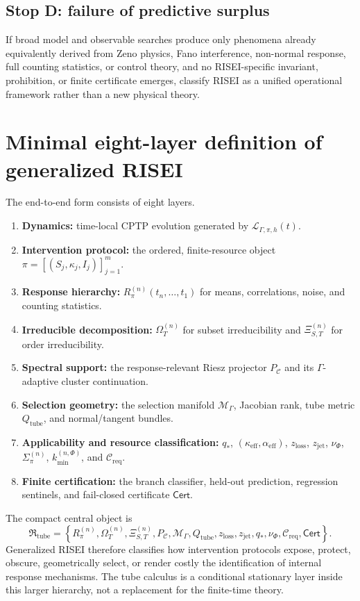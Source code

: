 \documentclass[11pt]{article}
\theoremstyle{definition}
\theoremstyle{remark}
\newcommand{\cL}{\mathcal L}
\newcommand{\cC}{\mathcal C}
\newcommand{\PhiF}{\Phi}
\newcommand{\OmegaI}{\Omega}
\newcommand{\XiI}{\Xi}
\newcommand{\cM}{\mathcal M}
\begin{document}
\subsection{Stop D: failure of predictive surplus}

If broad model and observable searches produce only phenomena already equivalently derived from Zeno physics, Fano interference, non-normal response, full counting statistics, or control theory, and no RISEI-specific invariant, prohibition, or finite certificate emerges, classify RISEI as a unified operational framework rather than a new physical theory.

\section{Minimal eight-layer definition of generalized RISEI}

The end-to-end form consists of eight layers.
\begin{enumerate}
  \item \textbf{Dynamics:} time-local CPTP evolution generated by $\cL_{\Gamma,\pi,h}(t)$.
  \item \textbf{Intervention protocol:} the ordered, finite-resource object $\pi=[(S_j,\kappa_j,I_j)]_{j=1}^{m}$.
  \item \textbf{Response hierarchy:} $R_{\pi}^{(n)}(t_n,\ldots,t_1)$ for means, correlations, noise, and counting statistics.
  \item \textbf{Irreducible decomposition:} $\OmegaI_T^{(n)}$ for subset irreducibility and $\XiI_{S,T}^{(n)}$ for order irreducibility.
  \item \textbf{Spectral support:} the response-relevant Riesz projector $P_{\cC}$ and its $\Gamma$-adaptive cluster continuation.
  \item \textbf{Selection geometry:} the selection manifold $\cM_\Gamma$, Jacobian rank, tube metric $Q_{\mathrm{tube}}$, and normal/tangent bundles.
  \item \textbf{Applicability and resource classification:} $q_*$, $(\kappa_{\mathrm{eff}},\alpha_{\mathrm{eff}})$, $z_{\mathrm{loss}}$, $z_{\mathrm{jet}}$, $\nu_{\PhiF}$, $\Sigma_{\pi}^{(n)}$, $k_{\min}^{(n,\PhiF)}$, and $\cC_{\mathrm{req}}$.
  \item \textbf{Finite certification:} the branch classifier, held-out prediction, regression sentinels, and fail-closed certificate $\mathsf{Cert}$.
\end{enumerate}
The compact central object is
\begin{equation}
\boxed{
\mathfrak R_{\mathrm{tube}}
 = \left\{
 R_{\pi}^{(n)},
 \OmegaI_T^{(n)},
 \XiI_{S,T}^{(n)},
 P_{\cC},
 \cM_\Gamma,
 Q_{\mathrm{tube}},
 z_{\mathrm{loss}},
 z_{\mathrm{jet}},
 q_*,
 \nu_{\PhiF},
 \cC_{\mathrm{req}},
 \mathsf{Cert}
 \right\}.
}
\label{eq:central-object}
\end{equation}
Generalized RISEI therefore classifies how intervention protocols expose, protect, obscure, geometrically select, or render costly the identification of internal response mechanisms. The tube calculus is a conditional stationary layer inside this larger hierarchy, not a replacement for the finite-time theory.
\end{document}
